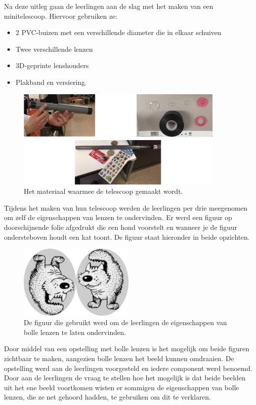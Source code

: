 \documentclass[a4paper,12pt,twoside]{article}%
\begin{document}
	Na deze uitleg gaan de leerlingen aan de slag met het maken van een minitelescoop. Hiervoor gebruiken ze:
	\begin{itemize}
		\item 2 PVC-buizen met een verschillende diameter die in elkaar schuiven
		\item Twee verschillende lenzen
		\item 3D-geprinte lenshouders
		\item Plakband en versiering.
	\end{itemize}
	\begin{figure}[!h]
		\centering
		\includegraphics[width=0.9\textwidth]{Telescoop}
		\caption{Het materiaal waarmee de telescoop gemaakt wordt.}
		\label{Fig::Telescoop}
	\end{figure}
	Tijdens het maken van hun telescoop werden de leerlingen per drie meegenomen om zelf de eigenschappen van lenzen te ondervinden. Er werd een figuur op doorschijnende folie afgedrukt die een hond voorstelt en wanneer je de figuur ondersteboven houdt een kat toont. De figuur staat hieronder in beide opzichten.
	
	\begin{figure}[!b]
		\centering
		\includegraphics[width=0.5\textwidth]{HondKat}
		\caption{De figuur die gebruikt werd om de  leerlingen de eigenschappen van bolle lenzen te laten ondervinden.}
		\label{Fig::HondKat}
	\end{figure}
	Door middel van een opstelling met bolle lenzen is het mogelijk om beide figuren zichtbaar te maken, aangezien bolle lenzen het beeld kunnen omdraaien. De opstelling werd aan de leerlingen voorgesteld en iedere component werd benoemd. Door aan de  leerlingen de vraag te stellen hoe het mogelijk is dat beide beelden uit het ene beeld voortkomen wisten er sommigen de eigenschappen van bolle lenzen, die ze net gehoord hadden, te gebruiken om dit te verklaren. 
	
\end{document}
